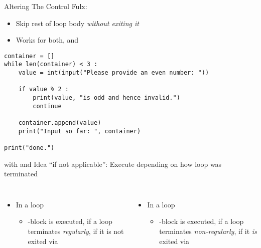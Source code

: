 
\begin{frame}[fragile]{Altering The Control Fulx: }
%
\begin{itemize}
\item Skip rest of loop body \emph{without exiting it}
\item Works for both,  and 
\end{itemize}
%
\begin{codebox}
\begin{verbatim}
container = []
while len(container) < 3 :
    value = int(input("Please provide an even number: "))
    
    if value % 2 :
        print(value, "is odd and hence invalid.")
        continue
        
    container.append(value)
    print("Input so far: ", container)

print("done.")
\end{verbatim}
\end{codebox}
%
\end{frame}


\begin{frame}[fragile]{ with  and }
%
Idea \enquote{if not applicable}: Execute depending on how loop was terminated
%
\begin{columns}[T]
	\begin{itemize}
	\item In a  loop
		\begin{itemize}
		\item {}-block is executed, if a loop terminates \emph{regularly}, \ie if it is not exited via 
		\end{itemize}
	\end{itemize}
	
	\begin{itemize}
	\item 
	In a  loop
		\begin{itemize}
		\item {}-block is executed, if a loop terminates \emph{non-regularly}, \ie if it \emph{is} exited via 
		\end{itemize}
	\end{itemize}
\end{columns}
%
\end{frame}


